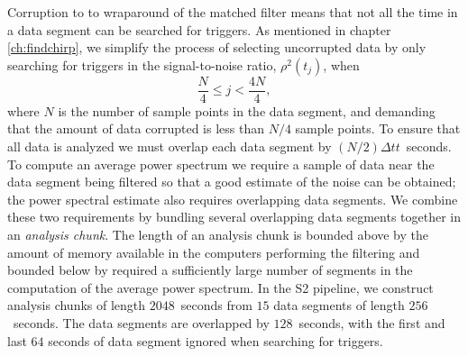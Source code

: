 Corruption to to wraparound of the matched filter means that not all the time
in a data segment can be searched for triggers. As mentioned in chapter
\ref{ch:findchirp}, we simplify the process of selecting uncorrupted data by
only searching for triggers in the signal-to-noise ratio, $\rho^2(t_j)$, when 
\begin{equation}
\frac{N}{4} \le j < \frac{4N}{4},
\end{equation}
where $N$ is the number of sample points in the data segment, and demanding
that the amount of data corrupted is less than $N/4$ sample points. To ensure
that all data is analyzed we must overlap each data segment by $(N/2)\Delta t
t$~seconds. To compute an average power spectrum we require a sample of data
near the data segment being filtered so that a good estimate of the noise can
be obtained; the power spectral estimate also requires overlapping data
segments. We combine these two requirements by bundling several overlapping
data segments together in an \emph{analysis chunk}. The length of an analysis
chunk is bounded above by the amount of memory available in the computers
performing the filtering and bounded below by required a sufficiently large
number of segments in the computation of the average power spectrum. In the S2
pipeline, we construct analysis chunks of length $2048$~seconds from $15$ data
segments of length $256$~seconds. The data segments are overlapped by
$128$~seconds, with the first and last $64$ seconds of data segment ignored
when searching for triggers. 

